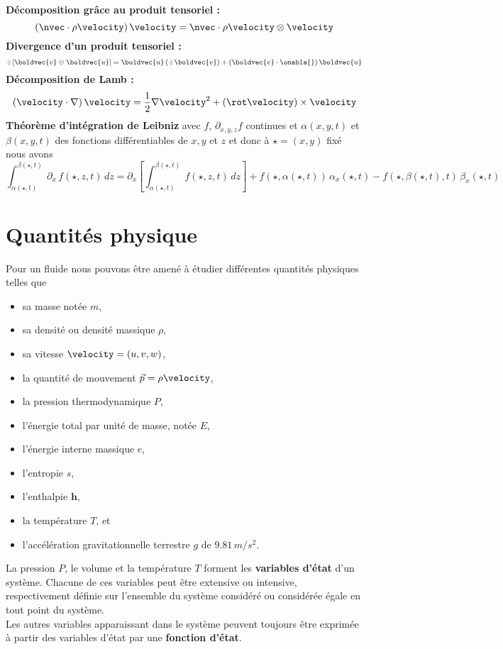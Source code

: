 \noindent \textbf{Décomposition grâce au produit tensoriel :}
\begin{equation}
\left(\nvec\cdot \rho\velocity\right)\velocity = \nvec \cdot \rho\velocity \otimes \velocity \label{op:identitytensorvelocity}
\end{equation}
\noindent\textbf{Divergence d'un produit tensoriel :}
\begin{equation}
\div[\boldvec{v}\otimes\boldvec{u}] = \boldvec{u} \left(\div \boldvec{v}\right) + \left(\boldvec{v}\cdot \onabla{}\right)\boldvec{u} \label{op:divprodvec}
\end{equation}
\noindent\textbf{Décomposition de Lamb :}
\begin{equation}
\left(\velocity\cdot\nabla\right)\velocity = \frac{1}{2}\nabla \velocity^2 + \left(\rot \velocity\right)\times\velocity\label{op:lamb}
\end{equation}
\noindent\textbf{Théorème d'intégration de Leibniz} avec $f$, $\partial_{x, y, z}f$ continues et $\alpha (x, y, t)$ et $\beta (x, y, t)$ des fonctions différentiables de $x, y$ et $z$ et donc à $\star = (x, y)$ fixé nous avons
\begin{equation}
	\int_{\alpha(\star, t)}^{\beta(\star, t)}\, \partial_x\,f (\star, z, t)\,dz = \partial_x\left[\int_{\alpha(\star, t)}^{\beta(\star, t)}\, f (\star,z, t)\,dz\right]+ f(\star, \alpha(\star, t))\,\alpha_x (\star, t)- f(\star,\beta(\star, t), t)\,\beta_x(\star, t)\label{op:leibniz}
\end{equation}

\section{Quantités physique}
Pour un fluide nous pouvons être amené à étudier différentes quantités physiques telles que
\begin{itemize}[label=$\mybullet$]
	\item sa masse notée $m$,
	\item sa densité ou densité massique $\rho$,
	\item sa vitesse $\velocity = \left(u, v, w\right)$,
	\item la quantité de mouvement $\vec{p} = \rho\velocity$,
	\item la pression thermodynamique $P$,
	\item l'énergie total par unité de masse, notée $E$,
	\item l'énergie interne massique $e$, 
	\item l'entropie $s$,
	\item l'enthalpie $\boldsymbol{h}$,
	\item la température $T$, et
	\item l'accélération gravitationnelle terrestre $g$ de $9.81\,m/s^2$.
\end{itemize}
La pression $P$, le volume et la température $T$ forment les \textbf{variables d'état} d'un système. Chacune de ces variables peut être extensive ou intensive, respectivement définie sur l'ensemble du système considéré ou considérée égale en tout point du système.\\
Les autres variables apparaissant dans le système peuvent toujours être exprimée à partir des variables d'état par une \textbf{fonction d'état}.